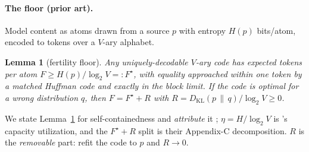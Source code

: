\documentclass[11pt]{article}
\newtheorem{lemma}{Lemma}
\begin{document}
\paragraph{The floor (prior art).} Model content as atoms drawn from a source $p$ with entropy $H(p)$
bits/atom, encoded to tokens over a $V$-ary alphabet.
\begin{lemma}[fertility floor]\label{lem:floor}
Any uniquely-decodable $V$-ary code has expected tokens per atom $F \ge H(p)/\log_2 V =: F^\star$, with
equality approached within one token by a matched Huffman code and exactly in the block limit. If the
code is optimal for a wrong distribution $q$, then $F = F^\star + R$ with
$R = D_{\mathrm{KL}}(p\,\|\,q)/\log_2 V \ge 0$.
\end{lemma}
\noindent We state Lemma~\ref{lem:floor} for self-containedness and \emph{attribute} it
\citep{cover2006elements, zouhar2023noiseless, erdogan2026infotok}; $\eta=H/\log_2 V$ is
\citeauthor{erdogan2026infotok}'s capacity utilization, and the $F^\star+R$ split is their Appendix-C
decomposition. $R$ is the \emph{removable} part: refit the code to $p$ and $R\to0$.
\end{document}
